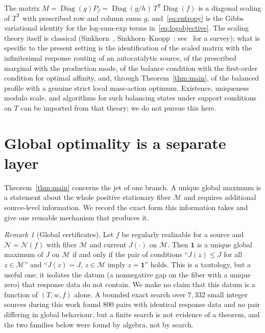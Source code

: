 \documentclass[11pt,reqno]{amsart}
\theoremstyle{plain}
\theoremstyle{definition}
\theoremstyle{remark}
\newtheorem{remark}[theorem]{Remark}
\numberwithin{equation}{section}
\newcommand{\one}{\mathbf{1}}
\newcommand{\Diag}{\operatorname{Diag}}
\newcommand{\T}{\mathsf{T}}
\begin{document}
The matrix $M=\Diag(g)P_f=\Diag(g/h)\,T^{\T}\Diag(f)$ is a diagonal scaling of $T^{\T}$ with prescribed row and column sums $g$, and~\eqref{eq:entropy} is the Gibbs variational identity for the log-sum-exp terms in~\eqref{eq:logobjective}.  The scaling theory itself is classical (Sinkhorn~\cite{Sin64}, Sinkhorn--Knopp~\cite{SK67}; see~\cite{Idel16} for a survey); what is specific to the present setting is the identification of the scaled matrix with the infinitesimal response routing of an autocatalytic source, of the prescribed marginal with the production mode, of the balance condition with the first-order condition for optimal affinity, and, through Theorem~\ref{thm:main}, of the balanced profile with a genuine strict local mass-action optimum.  Existence, uniqueness modulo scale, and algorithms for such balancing states under support conditions on $T$ can be imported from that theory; we do not pursue this here.

\section{Global optimality is a separate layer}\label{sec:global}

Theorem~\ref{thm:main} concerns the jet of one branch.  A unique global maximum is a statement about the whole positive stationary fiber $\mathcal M$ and requires additional source-level information.  We record the exact form this information takes and give one reusable mechanism that produces it.

\begin{remark}[Global certificates]\label{rem:certificate}
Let $f$ be regularly realizable for a source and $\mathcal N=\mathcal N(f)$ with fiber $\mathcal M$ and current $J(\cdot)$ on $\mathcal M$.  Then $\one$ is a unique global maximum of $J$ on $\mathcal M$ if and only if the pair of conditions ``$J(z)\le J$ for all $z\in\mathcal M$'' and ``$J(z)=J$, $z\in\mathcal M$ imply $z=\one$'' holds.  This is a tautology, but a useful one: it isolates the datum (a nonnegative gap on the fiber with a unique zero) that response data do not contain.  We make no claim that this datum is a function of $(T,w,f)$ alone.  A bounded exact search over $7{,}332$ small integer sources during this work found $800$ pairs with identical response data and no pair differing in global behaviour, but a finite search is not evidence of a theorem, and the two families below were found by algebra, not by search.
\end{remark}
\end{document}

